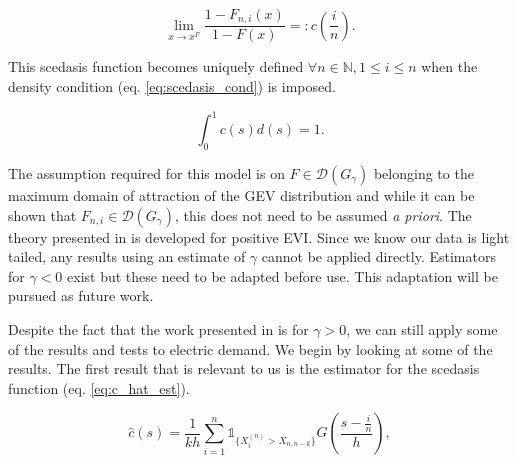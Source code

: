 \begin{equation} \label{eq:scedasisfn}
\lim_{x \rightarrow x^F} \frac{1-F_{n,i}(x)}{1 - F(x)} =: c\left(\frac{i}{n}\right).
\end{equation}

\noindent This scedasis function becomes uniquely defined  $\forall n \in \mathbb{N}, 1 \le i \le n$ when the density condition (eq. \ref{eq:scedasis_cond}) is imposed.


\begin{equation} \label{eq:scedasis_cond}
\int_0^1 c(s)d(s) = 1.
\end{equation}

The assumption required for this model is on $F  \in \mathcal{D}(G_{\gamma})$ belonging to the maximum domain of attraction of the GEV distribution and while it can be shown that $F_{n,i}  \in \mathcal{D}(G_{\gamma})$, this does not need to be assumed \textit{a priori}. The theory presented in \cite{einmahl16} is developed for positive EVI. Since we know our data is light tailed, any results using an estimate of $\gamma$ cannot be applied directly. Estimators for $\gamma <0$ exist \citep{Ferreira17} but these need to be adapted before use. This adaptation will be pursued as future work. %
%

Despite the fact that the work presented in \cite{einmahl16} is for $\gamma >0$, we can still apply some of the results and tests to electric demand. We begin by looking at some of the results. %
The first result that is relevant to us is the estimator for the scedasis function (eq. \ref{eq:c_hat_est}).

\begin{equation} \label{eq:c_hat_est}
\hat{c}(s) = \frac{1}{kh} \sum_{i=1}^n \mathbb{1}_{\{X_i^{(n)} > X_{n,n-k}\}}G \left(\frac{s-\frac{i}{n}}{h} \right),
\end{equation}

